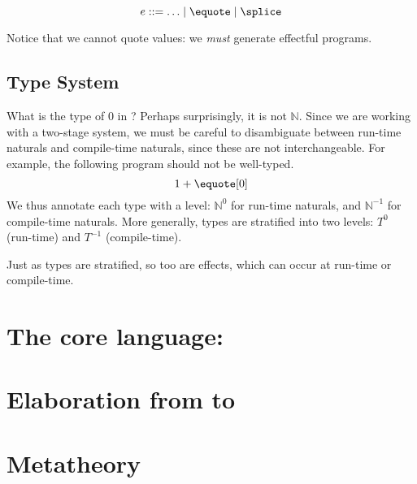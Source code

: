 \[e ::= \ldots \mid \equote \mid \splice \]

Notice that we cannot quote values: we \textit{must} generate effectful programs.

\subsection{Type System}
What is the type of $0$ in \sourceLang{}? Perhaps surprisingly, it is not $\mathbb{N}$. Since we are working with a two-stage system, we must be careful to disambiguate between run-time naturals and compile-time naturals, since these are not interchangeable. For example, the following program should not be well-typed. 
\[1 + \equote[0]\]
We thus annotate each type with a level: $\mathbb{N}^0$ for run-time naturals, and $\mathbb{N}^{-1}$ for compile-time naturals. More generally, types are stratified into two levels: $T^0$ (run-time) and $T^{-1}$ (compile-time). 

Just as types are stratified, so too are effects, which can occur at run-time or compile-time. 

\section{The core language: \texorpdfstring{\coreLang{}}{Lambda-Op-AST}}\label{section:core-lang}

\section{Elaboration from \texorpdfstring{\sourceLang{}}{Lambda-Op-Quote-Splice} to \texorpdfstring{\coreLang{}}{Lambda-Op-AST}}\label{section:elaboration}

\section{Metatheory}\label{section:metatheory}